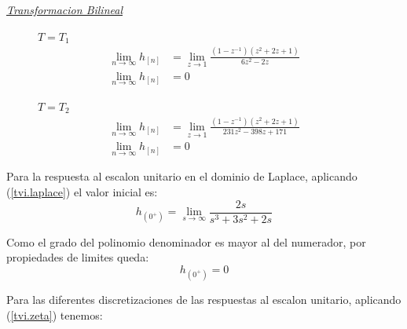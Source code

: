 \documentclass[a4paper,12pt]{report}
\begin{document}
\begin{enumerate}[label=\alph*), left=0pt]
                {\centering\underline{\textit{Transformacion Bilineal}}\par}
                \begin{figure}[h!]
                    \centering
                    \begin{minipage}{0.4\textwidth}
                        \centering
                        $T = T_1$
                        \begin{align*}
                            \lim_{n \to \infty} h_{[n]} &= \lim_{z \to 1}  \frac{\left(1 - z^{-1}\right) 
                                \left(z^2 + 2z + 1\right)}{6z^2 - 2z}\\
                            \lim_{n \to \infty} h_{[n]} &= 0
                        \end{align*}
                    \end{minipage}
                    \hspace{0.5cm}
                    \begin{minipage}{0.4\textwidth}
                        \centering
                        $T = T_2$
                        \begin{align*}
                            \lim_{n \to \infty} h_{[n]} &= \lim_{z \to 1} \frac{\left(1 - z^{-1}\right)
                                \left(z^2 + 2z + 1\right)}{231z^2 - 398z + 171}\\
                            \lim_{n \to \infty} h_{[n]} &= 0
                        \end{align*}
                    \end{minipage}
                \end{figure}

                Para la respuesta al escalon unitario en el dominio de Laplace, aplicando (\ref{tvi.laplace}) el valor inicial es:
                \begin{equation*}
                    h_{(0^+)} = \lim_{s \to \infty} \frac{2s}{s^3 + 3s^2 + 2s}
                \end{equation*}

                Como el grado del polinomio denominador es mayor al del numerador, por propiedades de limites queda:
                \begin{equation*}
                    h_{(0^+)} = 0
                \end{equation*}

                Para las diferentes discretizaciones de las respuestas al escalon unitario, aplicando (\ref{tvi.zeta}) tenemos:


\end{enumerate}
\end{document}
